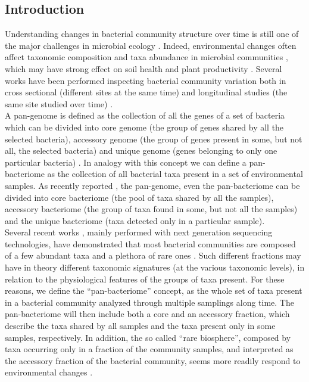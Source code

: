 \subsection{Introduction}
Understanding changes in bacterial community structure over time is still one of the major challenges in microbial ecology \cite{ge2008differences, zhou2014stochasticity, donn2014evolution}. Indeed, environmental changes often affect taxonomic composition and taxa abundance in microbial communities \cite{allison2008resistance}, which may have strong effect on soil health and plant productivity \cite{chaparro2012manipulating}. Several works have been performed inspecting bacterial community variation both in cross sectional (different sites at the same time) and longitudinal studies (the same site studied over time) \cite{costello2009bacterial, pini2012exploring, smith2012cervical, bartram2014exploring, logares2012biogeography, chen2013shifts, kuang2012contemporary}.\\
A pan-genome is defined as the collection of all the genes of a set of bacteria which can be divided into core genome (the group of genes shared by all the selected bacteria), accessory genome (the group of genes present in some, but not all, the selected bacteria) and unique genome (genes belonging to only one particular bacteria) \cite{tettelin2008comparative}. In analogy with this concept we can define a pan-bacteriome as the collection of all bacterial taxa present in a set of environmental samples. As recently reported \cite{hardoim2014temporal}, the pan-genome, even the pan-bacteriome can be divided into core bacteriome (the pool of taxa shared by all the samples), accessory bacteriome (the group of taxa found in some, but not all the samples) and the unique bacteriome (taxa detected only in a particular sample).\\
Several recent works \cite{bartram2014exploring, logares2012biogeography, bowen2012salt, aravindraja2013ultradeep, dohrmann2012importance, gibbons2013evidence, kim2013general, oh2013altered, portillo2013cell, sanchez2013assessing, szekely2014importance, wegner2013disturbance}, mainly performed with next generation sequencing technologies, have demonstrated that most bacterial communities are composed of a few abundant taxa and a plethora of rare ones \cite{pedros2012rare}. Such different fractions may have in theory different taxonomic signatures (at the various taxonomic levels), in relation to the physiological features of the groups of taxa present. For these reasons, we define the ``pan-bacteriome'' concept, as the whole set of taxa present in a bacterial community analyzed through multiple samplings along time. The pan-bacteriome will then include both a core and an accessory fraction, which describe the taxa shared by all samples and the taxa present only in some samples, respectively. In addition, the so called ``rare biosphere'', composed by taxa occurring only in a fraction of the community samples, and interpreted as the accessory fraction of the bacterial community, seems more readily respond to environmental changes \cite{dohrmann2012importance, kim2013general, szekely2014importance, campbell2011activity, gobet2011diversity}.\\
